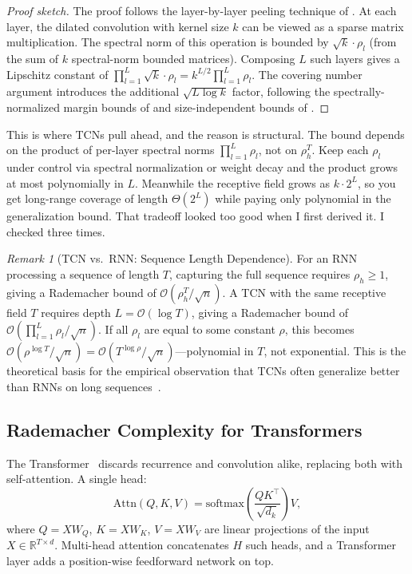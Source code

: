 \documentclass[11pt]{article}
\theoremstyle{definition}
\theoremstyle{remark}
\newtheorem{remark}[theorem]{Remark}
\newcommand{\R}{\mathbb{R}}
\newcommand{\cO}{\mathcal{O}}
\begin{document}
\begin{proof}[Proof sketch]
The proof follows the layer-by-layer peeling technique of \citet{bartlett2017spectrally}.
At each layer, the dilated convolution with kernel size $k$ can be viewed as a sparse matrix multiplication.
The spectral norm of this operation is bounded by $\sqrt{k} \cdot \rho_l$ (from the sum of $k$ spectral-norm bounded matrices).
Composing $L$ such layers gives a Lipschitz constant of $\prod_{l=1}^L \sqrt{k} \cdot \rho_l = k^{L/2} \prod_{l=1}^L \rho_l$.
The covering number argument introduces the additional $\sqrt{L \log k}$ factor, following the spectrally-normalized margin bounds of \citet{bartlett2017spectrally} and size-independent bounds of \citet{golowich2018size}.
\end{proof}

This is where TCNs pull ahead, and the reason is structural.
The bound depends on the product of per-layer spectral norms $\prod_{l=1}^L \rho_l$, not on $\rho_h^T$.
Keep each $\rho_l$ under control via spectral normalization or weight decay and the product grows at most polynomially in $L$.
Meanwhile the receptive field grows as $k \cdot 2^L$, so you get long-range coverage of length $\Theta(2^L)$ while paying only polynomial in the generalization bound.
That tradeoff looked too good when I first derived it.
I checked three times.

\begin{remark}[TCN vs.\ RNN: Sequence Length Dependence]
For an RNN processing a sequence of length $T$, capturing the full sequence requires $\rho_h \geq 1$, giving a Rademacher bound of $\cO(\rho_h^T / \sqrt{n})$.
A TCN with the same receptive field $T$ requires depth $L = \cO(\log T)$, giving a Rademacher bound of $\cO(\prod_{l=1}^L \rho_l / \sqrt{n})$.
If all $\rho_l$ are equal to some constant $\rho$, this becomes $\cO(\rho^{\log T} / \sqrt{n}) = \cO(T^{\log \rho} / \sqrt{n})$---polynomial in $T$, not exponential.
This is the theoretical basis for the empirical observation that TCNs often generalize better than RNNs on long sequences~\citep{bai2018empirical}.
\end{remark}


\subsection{Rademacher Complexity for Transformers}\label{sec:theory:transformer}

The Transformer~\citep{vaswani2017attention} discards recurrence and convolution alike, replacing both with self-attention.
A single head:
\[
    \mathrm{Attn}(Q, K, V) = \mathrm{softmax}\!\left(\frac{QK^\top}{\sqrt{d_k}}\right) V,
\]
where $Q = XW_Q$, $K = XW_K$, $V = XW_V$ are linear projections of the input $X \in \R^{T \times d}$.
Multi-head attention concatenates $H$ such heads, and a Transformer layer adds a position-wise feedforward network on top.
\end{document}

